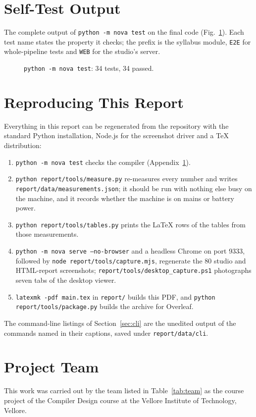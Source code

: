\documentclass[conference]{IEEEtran}
\newcommand{\code}[1]{\texttt{#1}}
\begin{document}
\section{Self-Test Output}
\label{app:tests}
The complete output of \code{python -m nova test} on the final code (Fig.~\ref{fig:testoutput}). Each test name states the property it checks; the prefix is the syllabus module, \code{E2E} for whole-pipeline tests and \code{WEB} for the studio's server.

\begin{figure}[!tp]

\caption{\code{python -m nova test}: 34 tests, 34 passed.}
\label{fig:testoutput}
\end{figure}

\section{Reproducing This Report}
\label{app:repro}
Everything in this report can be regenerated from the repository with the standard Python installation, Node.js for the screenshot driver and a TeX distribution:
\begin{enumerate}
\item \code{python -m nova test} checks the compiler (Appendix~\ref{app:tests}).
\item \code{python report/tools/measure.py} re-measures every number and writes \code{report/data/measurements.json}; it should be run with nothing else busy on the machine, and it records whether the machine is on mains or battery power.
\item \code{python report/tools/tables.py} prints the LaTeX rows of the tables from those measurements.
\item \code{python -m nova serve --no-browser} and a headless Chrome on port 9333, followed by \code{node report/tools/capture.mjs}, regenerate the 80 studio and HTML-report screenshots; \code{report/tools/desktop\_capture.ps1} photographs seven tabs of the desktop viewer.
\item \code{latexmk -pdf main.tex} in \code{report/} builds this PDF, and \code{python report/tools/package.py} builds the archive for Overleaf.
\end{enumerate}
The command-line listings of Section~\ref{sec:cli} are the unedited output of the commands named in their captions, saved under \code{report/data/cli}.

\section*{Project Team}
This work was carried out by the team listed in Table~\ref{tab:team} as the course project of the Compiler Design course at the Vellore Institute of Technology, Vellore.
\end{document}
